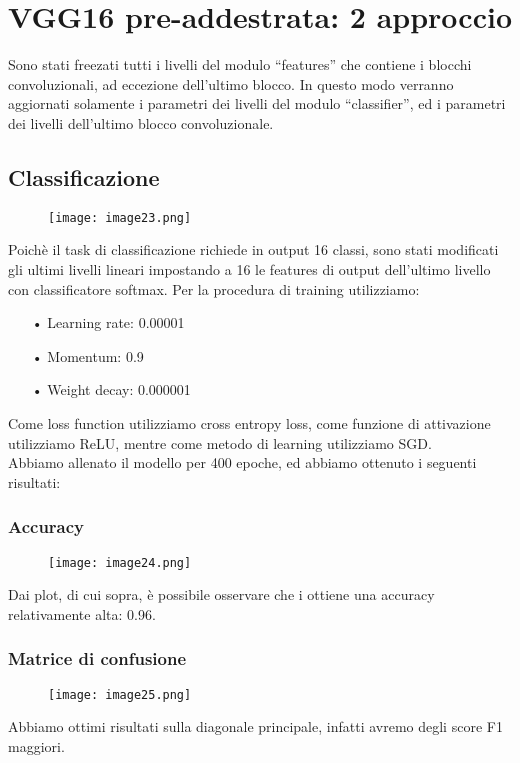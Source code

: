 \section{VGG16 pre-addestrata: {2\textdegree} approccio}
Sono stati freezati tutti i livelli del modulo “features” che contiene i blocchi convoluzionali, ad eccezione dell’ultimo blocco. In questo modo verranno aggiornati solamente i parametri dei livelli del modulo “classifier”, ed i parametri dei livelli dell’ultimo blocco convoluzionale.
\subsection{Classificazione}
\begin{figure}[H]
	\centering
	\texttt{[image: image23.png]}
\end{figure}
Poichè il task di classificazione richiede in output 16 classi, sono stati modificati gli ultimi livelli lineari impostando a 16 le features di output dell’ultimo livello con classificatore softmax.
Per la procedura di training utilizziamo: 
\begin{itemize}
	\item[•]Learning rate: 0.00001
	\item[•]Momentum: 0.9
	\item[•]Weight decay: 0.000001
\end{itemize}
Come loss function utilizziamo cross entropy loss, come funzione di attivazione utilizziamo ReLU, mentre come metodo di learning utilizziamo SGD. \\
Abbiamo allenato il modello per 400 epoche, ed abbiamo ottenuto i seguenti risultati:

\subsubsection{Accuracy}
\begin{figure}[H]
	\centering
	\texttt{[image: image24.png]}
\end{figure}
Dai plot, di cui sopra, è possibile osservare che i ottiene una accuracy relativamente alta: 0.96.

\subsubsection{Matrice di confusione}
\begin{figure}[H]
	\centering
	\texttt{[image: image25.png]}
\end{figure}
Abbiamo ottimi risultati sulla diagonale principale, infatti avremo degli score F1 maggiori.

